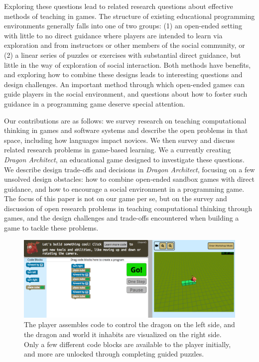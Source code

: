 \documentclass{sig-alternate}
\newcommand{\gametitle}{{\emph{Dragon Architect}}}
\begin{document}
Exploring these questions lead to related research questions about effective methods of teaching in games. The structure of existing educational programming environments generally falls into one of two groups: (1) an open-ended setting with little to no direct guidance where players are intended to learn via exploration and from instructors or other members of the social community, or (2) a linear series of puzzles or exercises with substantial direct guidance, but little in the way of exploration of social interaction. Both methods have benefits, and exploring how to combine these designs leads to interesting questions and design challenges. An important method through which open-ended games can guide players in the social environment, and questions about how to foster such guidance in a programming game deserve special attention.

Our contributions are as follows: we survey research on teaching computational thinking in games and software systems and describe the open problems in that space, including how languages impact novices. We then survey and discuss related research problems in game-based learning. We a currently creating \gametitle{}, an educational game designed to investigate these questions. We describe design trade-offs and decisions in \gametitle{}, focusing on a few unsolved design obstacles: how to combine open-ended sandbox games with direct guidance, and how to encourage a social environment in a programming game. The focus of this paper is not on our game per se, but on the survey and discussion of open research problems in teaching computational thinking through games, and the design challenges and trade-offs encountered when building a game to tackle these problems.

\begin{figure}[t!]
  \centering
  \includegraphics[width=\textwidth]{images/overall-example}
  \caption{The player assembles code to control the dragon on the left side, and the dragon and world it inhabits are visualized on the right side. Only a few different code blocks are available to the player initially, and more are unlocked through completing guided puzzles.}
  \label{fig:overall}
\end{figure}
\end{document}
